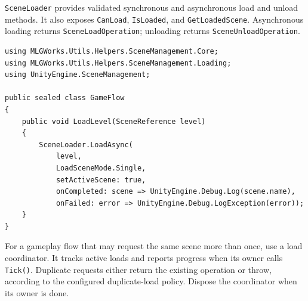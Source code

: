 \texttt{SceneLoader} provides validated synchronous and asynchronous load and unload methods. It also exposes \texttt{CanLoad}, \texttt{IsLoaded}, and \texttt{GetLoadedScene}. Asynchronous loading returns \texttt{SceneLoadOperation}; unloading returns \texttt{SceneUnloadOperation}.

\begin{lstlisting}
using MLGWorks.Utils.Helpers.SceneManagement.Core;
using MLGWorks.Utils.Helpers.SceneManagement.Loading;
using UnityEngine.SceneManagement;

public sealed class GameFlow
{
    public void LoadLevel(SceneReference level)
    {
        SceneLoader.LoadAsync(
            level,
            LoadSceneMode.Single,
            setActiveScene: true,
            onCompleted: scene => UnityEngine.Debug.Log(scene.name),
            onFailed: error => UnityEngine.Debug.LogException(error));
    }
}
\end{lstlisting}

For a gameplay flow that may request the same scene more than once, use a load coordinator. It tracks active loads and reports progress when its owner calls \texttt{Tick()}. Duplicate requests either return the existing operation or throw, according to the configured duplicate-load policy. Dispose the coordinator when its owner is done.
